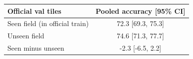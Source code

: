 \begin{tabular}{lc}
\toprule
Official val tiles & Pooled accuracy [95\% CI] \\
\midrule
Seen field (in official train) & 72.3 [69.3, 75.3] \\
Unseen field & 74.6 [71.3, 77.7] \\
Seen minus unseen & -2.3 [-6.5, 2.2] \\
\bottomrule
\end{tabular}
